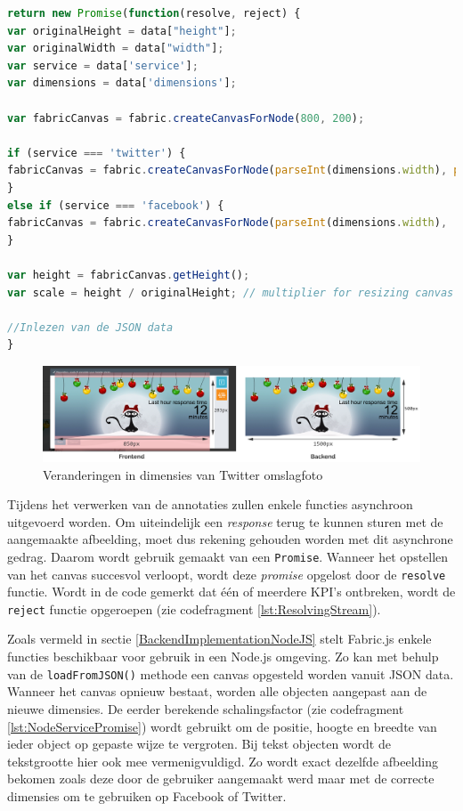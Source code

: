 \begin{lstlisting}[caption={renderer.js - Image renderer},label=lst:NodeServicePromise,language=javascript]
return new Promise(function(resolve, reject) {
var originalHeight = data["height"];
var originalWidth = data["width"];
var service = data['service'];
var dimensions = data['dimensions'];

var fabricCanvas = fabric.createCanvasForNode(800, 200);

if (service === 'twitter') {
fabricCanvas = fabric.createCanvasForNode(parseInt(dimensions.width), parseInt(dimensions.height));
}
else if (service === 'facebook') {
fabricCanvas = fabric.createCanvasForNode(parseInt(dimensions.width),  parseInt(dimensions.height));
}

var height = fabricCanvas.getHeight();
var scale = height / originalHeight; // multiplier for resizing canvas + objects

//Inlezen van de JSON data
}
\end{lstlisting}

\begin{figure}[H]
	\centering
	\includegraphics[width=1\textwidth]{Figuren/FrontToBack.png}
	\caption{Veranderingen in dimensies van Twitter omslagfoto}
	\label{fig:FrontToBackend}
\end{figure} 

Tijdens het verwerken van de annotaties zullen enkele functies asynchroon uitgevoerd worden. Om uiteindelijk een \textit{response} terug te kunnen sturen met de aangemaakte afbeelding, moet dus rekening gehouden worden met dit asynchrone gedrag. Daarom wordt gebruik gemaakt van een \texttt{Promise}. Wanneer het opstellen van het canvas succesvol verloopt, wordt deze \textit{promise} opgelost door de \texttt{resolve} functie. Wordt in de code gemerkt dat \'{e}\'{e}n of meerdere KPI's ontbreken, wordt de \texttt{reject} functie opgeroepen (zie codefragment \ref{lst:ResolvingStream}). 

Zoals vermeld in sectie \ref{BackendImplementationNodeJS} stelt Fabric.js enkele functies beschikbaar voor gebruik in een Node.js omgeving. Zo kan met behulp van de \texttt{loadFromJSON()} methode een canvas opgesteld worden vanuit JSON data. Wanneer het canvas opnieuw bestaat, worden alle objecten aangepast aan de nieuwe dimensies. De eerder berekende schalingsfactor (zie codefragment \ref{lst:NodeServicePromise}) wordt gebruikt om de positie, hoogte en breedte van ieder object op gepaste wijze te vergroten. Bij tekst objecten wordt de tekstgrootte hier ook mee vermenigvuldigd. Zo wordt exact dezelfde afbeelding bekomen zoals deze door de gebruiker aangemaakt werd maar met de correcte dimensies om te gebruiken op Facebook of Twitter. 

